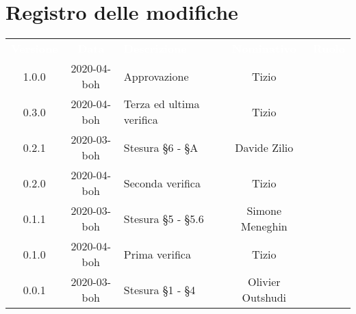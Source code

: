 \section*{Registro delle modifiche}
{
	\centering
	\begin{longtable}{ c c  C{4cm}  c  c }
		\textcolor{white}{\textbf{Versione}} & \textcolor{white}{\textbf{Data}} & \textcolor{white}{\textbf{Descrizione}} & \textcolor{white}{\textbf{Nominativo}} & \textcolor{white}{\textbf{Ruolo}}\\		
		1.0.0 & 2020-04-boh   & Approvazione & Tizio &\RdP{} \\
		0.3.0 & 2020-04-boh   & Terza ed ultima verifica & Tizio &\ver{} \\
		0.2.1 & 2020-03-boh & Stesura \S 6 - \S A & Davide Zilio &\adm{} \\
		0.2.0 & 2020-04-boh   & Seconda verifica & Tizio &\ver{} \\
		0.1.1 & 2020-03-boh & Stesura \S 5 - \S 5.6 & Simone Meneghin &\adm{} \\
		0.1.0 & 2020-04-boh   & Prima verifica & Tizio &\ver{} \\
		0.0.1 & 2020-03-boh & Stesura \S 1 - \S 4 & Olivier Outshudi &\adm{}\\		
		
	\end{longtable}

} 
